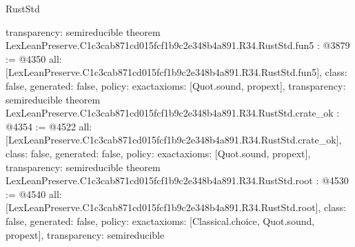 \begin{lexlean}{RustStd}
\begin{coremodule}
{  transparency: semireducible
}
theorem LexLeanPreserve.C1c3cab871cd015fcf1b9c2e348b4a891.R34.RustStd.fun5 : @3879 := @4350 {
  all: [LexLeanPreserve.C1c3cab871cd015fcf1b9c2e348b4a891.R34.RustStd.fun5],
  class: false,
  generated: false,
  policy: exact{axioms: [Quot.sound, propext]},
  transparency: semireducible
}
theorem LexLeanPreserve.C1c3cab871cd015fcf1b9c2e348b4a891.R34.RustStd.crate_ok : @4354 := @4522 {
  all: [LexLeanPreserve.C1c3cab871cd015fcf1b9c2e348b4a891.R34.RustStd.crate_ok],
  class: false,
  generated: false,
  policy: exact{axioms: [Quot.sound, propext]},
  transparency: semireducible
}
theorem LexLeanPreserve.C1c3cab871cd015fcf1b9c2e348b4a891.R34.RustStd.root : @4530 := @4540 {
  all: [LexLeanPreserve.C1c3cab871cd015fcf1b9c2e348b4a891.R34.RustStd.root],
  class: false,
  generated: false,
  policy: exact{axioms: [Classical.choice, Quot.sound, propext]},
  transparency: semireducible
}


\end{coremodule}
\end{lexlean}
